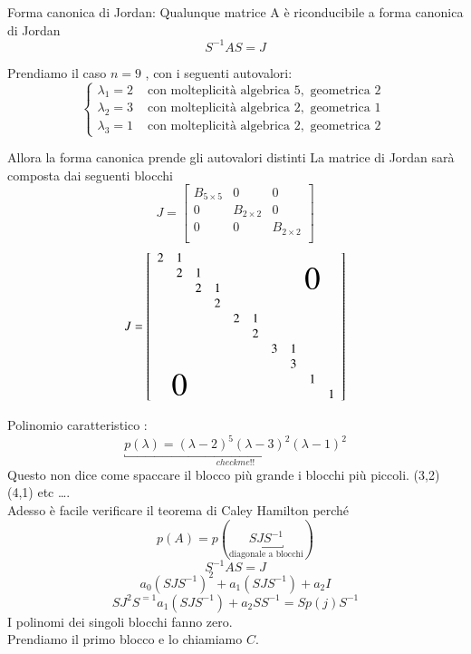 
Forma canonica di Jordan:
Qualunque matrice A \`e riconducibile a forma canonica di Jordan
$$S^{-1} A S =J $$
\begin{example}
Prendiamo il caso $n = 9$ , con i seguenti autovalori:
$$
\left\{
\begin{array}{cc}
 \lambda_1 = 2  & \text{ con molteplicit\`a algebrica } 5
,\text{ geometrica  2 }\\
\lambda_2 = 3   & \text{ con molteplicit\`a algebrica } 2
,\text{ geometrica  1 } \\
\lambda_3 = 1   & \text{ con molteplicit\`a algebrica } 2
,\text{ geometrica  2 } 
\end{array}
\right.
$$

Allora la forma canonica prende gli autovalori distinti
La matrice di Jordan sar\`a composta dai seguenti blocchi
$$ J =
\left[
\begin{array}{ccc}
B_{5 \times 5} & 0 & 0 \\ 
0 & B_{2 \times 2}  & 0 \\
0 & 0 & B_{2 \times 2} \\
\end{array}
\right]
$$
$$
J = 
\left[
\begin{array}{cccccccccc}
2& 1& & & & & & \multicolumn{3}{c}{\multirow{4}{*}{\Huge $0$}}
 \\
& 2 & 1 & & & & & & \\
& &2& 1 & & & & & & \\
& & & 2 & & & & & & \\
& & & &2 & 1 & & & & \\
& & & & & 2 & & & & \\
& & & & & & 3 & 1 & & \\
\multicolumn{3}{c}{\multirow{4}{*}{\Huge $0$}}
& &  & & & 3 & & \\
& & & & & & & & 1& \\
& & & & & & & & & 1 \\
\end{array}
\right]
$$

Polinomio caratteristico :
$$
\underbracket{p(\lambda) = (\lambda -2)^{5} (\lambda -3)^{2} (\lambda -1)^2}_{checkme!!}$$
Questo non dice come spaccare il blocco più grande i blocchi più piccoli.
(3,2) (4,1) etc \ldots. \\
Adesso \`e facile verificare il teorema di Caley Hamilton perch\'e
$$p(A) = p(\underbracket{SJS^{-1}}_{\text{diagonale a blocchi}})$$
$$ S^{-1} A S = J$$
$$a_0(SJS^{-1})^{2} + a_1 (SJS^{-1}) + a_2 I$$
$$ SJ^{2}S^{=1}      a_1(SJS^{-1}) + a_2 S S^{-1} = S p(j) S^{-1}$$
I polinomi dei singoli blocchi fanno zero.\\
Prendiamo il primo blocco e lo chiamiamo $C$.


\end{example}

